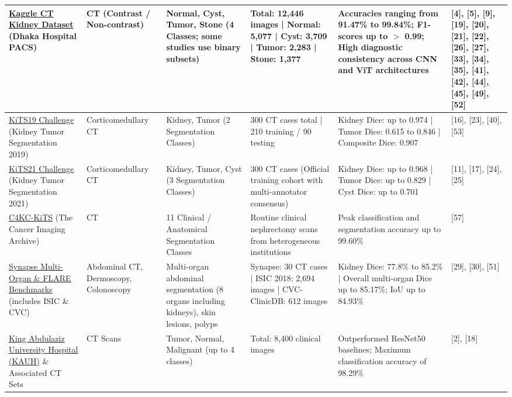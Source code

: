 \documentclass{article}
\begin{document}
\begin{longtable}{|L{3.0cm}|L{1.8cm}|L{2.5cm}|L{3.2cm}|L{4.2cm}|L{1.8cm}|}
\href{https://www.kaggle.com/datasets/nazmul0087/ct-kidney-dataset-normal-cyst-tumor-and-stone}{Kaggle CT Kidney Dataset} (Dhaka Hospital PACS) & CT (Contrast / Non-contrast) & Normal, Cyst, Tumor, Stone (4 Classes; some studies use binary subsets) & Total: 12,446 images | Normal: 5,077 | Cyst: 3,709 | Tumor: 2,283 | Stone: 1,377 & Accuracies ranging from 91.47\% to 99.84\%; F1-scores up to $>$ 0.99; High diagnostic consistency across CNN and ViT architectures & [4], [5], [9], [19], [20], [21], [22], [26], [27], [33], [34], [35], [41], [42], [44], [45], [49], [52] \\
\hline
\href{https://github.com/neheller/kits19/tree/master/data}{KiTS19 Challenge} (Kidney Tumor Segmentation 2019) & Corticomedullary CT & Kidney, Tumor (2 Segmentation Classes) & 300 CT cases total | 210 training / 90 testing & Kidney Dice: up to 0.974 | Tumor Dice: 0.615 to 0.846 | Composite Dice: 0.907 & [16], [23], [40], [53] \\
\hline
\href{https://github.com/neheller/kits21/tree/master/kits21/data}{KiTS21 Challenge} (Kidney Tumor Segmentation 2021) & Corticomedullary CT & Kidney, Tumor, Cyst (3 Segmentation Classes) & 300 CT cases (Official training cohort with multi-annotator consensus) & Kidney Dice: up to 0.968 | Tumor Dice: up to 0.829 | Cyst Dice: up to 0.701 & [11], [17], [24], [25] \\
\hline
\href{https://www.cancerimagingarchive.net/collection/c4kc-kits/}{C4KC-KiTS} (The Cancer Imaging Archive) & CT & 11 Clinical / Anatomical Segmentation Classes & Routine clinical nephrectomy scans from heterogeneous institutions & Peak classification and segmentation accuracy up to 99.60\% & [57] \\
\hline
\href{https://www.synapse.org/#!Synapse:syn3193805/wiki/217789}{Synapse Multi-Organ \& FLARE Benchmarks} (includes ISIC \& CVC) & Abdominal CT, Dermoscopy, Colonoscopy & Multi-organ abdominal segmentation (8 organs including kidneys), skin lesions, polyps & Synapse: 30 CT cases | ISIC 2018: 2,694 images | CVC-ClinicDB: 612 images & Kidney Dice: 77.8\% to 85.2\% | Overall multi-organ Dice up to 85.17\%; IoU up to 84.93\% & [29], [30], [51] \\
\hline
\href{https://github.com/DaliaAlzubi/KidneyTumor/tree/main/Dataset}{King Abdulaziz University Hospital (KAUH)} \& Associated CT Sets & CT Scans & Tumor, Normal, Malignant (up to 4 classes) & Total: 8,400 clinical images & Outperformed ResNet50 baselines; Maximum classification accuracy of 98.29\% & [2], [18] \\

\end{longtable}
\end{document}
